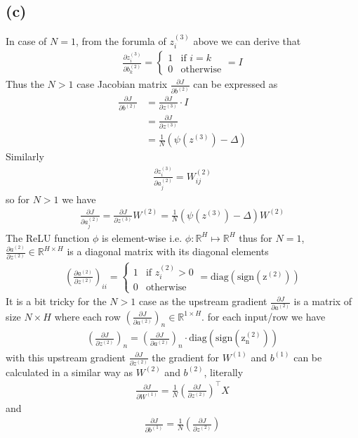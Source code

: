 \documentclass{article}
\newcommand{\bb}{b^{(2)}}
\newcommand{\ab}{a^{(2)}}
\newcommand{\zc}{z^{(3)}}
\newcommand{\Wb}{W^{(2)}}
\begin{document}
\subsection*{(c)}
\newcommand{\zb}{z^{(2)}}
\newcommand{\Wa}{W^{(1)}}
\newcommand{\ba}{b^{(1)}}
In case of $N = 1$, from the forumla of $\zc_i$ above we can derive that
\begin{align*}
    \frac{\partial \zc_i}{\partial \bb_k} = \begin{cases}
        1 & \text{if } i = k\\
        0 & \text{otherwise}
    \end{cases} = I
\end{align*}
Thus the $N > 1$ case Jacobian matrix $\frac{\partial J}{\partial \bb}$ can be expressed as
\begin{align*}
    \frac{\partial J}{\partial \bb} &= \frac{\partial J}{\partial \zc} \cdot I\\
    &= \frac{\partial J}{\partial \zc}\\
    &= \frac{1}{N}\left(\psi(z^{(3)}) - \Delta\right)
\end{align*}
Similarly
\begin{align*}
    \frac{\partial \zc_i}{\partial \ab_j} = \Wb_{ij}
\end{align*}
so for $N > 1$ we have
\begin{align*}
\frac{\partial J}{\partial \ab_j} = \frac{\partial J}{\partial \zc}  \Wb = 
\frac{1}{N}\left(\psi(z^{(3)}) - \Delta\right) \Wb
\end{align*}
The ReLU function $\phi$ is element-wise i.e. $\phi : \mathbb{R}^H \mapsto \mathbb{R}^H$
thus for $N = 1$, $\frac{\partial \ab}{\partial \zb} \in \mathbb{R}^{H\times H}$ is a diagonal matrix with its diagonal elements
\begin{align*}
    \left(\frac{\partial \ab}{\partial \zb}\right)_{ii} = \begin{cases}
        1 & \text{if } \zb_{i} > 0\\
        0 & \text{otherwise}
    \end{cases} = \mathrm{diag}(\mathrm{sign(\zb)})
\end{align*}
It is a bit tricky for the $N > 1$ case
as the upstream gradient $\frac{\partial J}{\partial \ab}$ is a matrix of size $N\times H$
where each row $(\frac{\partial J}{\partial \ab})_n\in\mathbb{R}^{1\times H}$.
for each input/row we have 
\begin{align*}
    (\frac{\partial J}{\partial \zb})_n = (\frac{\partial J}{\partial \ab})_n \cdot \mathrm{diag}(\mathrm{sign(\zb_n)})
\end{align*}
with this upstream gradient $\frac{\partial J}{\partial \zb}$
the gradient for $\Wa$ and $\ba$ can be calculated in a similar way as $\Wb$ and $\bb$, literally
\begin{align*}
    \frac{\partial J}{\partial \Wa} = \frac{1}{N}{\left(\frac{\partial J}{\partial \zb}\right)}^\top X
\end{align*}
and 
\begin{align*}
    \frac{\partial J}{\partial \ba} = \frac{1}{N}\left(\frac{\partial J}{\partial \zb}\right)
\end{align*}
\end{document}
